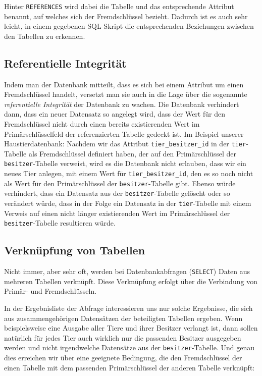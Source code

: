 Hinter \lstinline|REFERENCES| wird dabei die Tabelle und das entsprechende
Attribut benannt, auf welches sich der Fremdschlüssel bezieht. Dadurch ist es
auch sehr leicht, in einem gegebenen SQL-Skript die entsprechenden Beziehungen
zwischen den Tabellen zu erkennen.


\subsection{Referentielle Integrität}

Indem man der Datenbank mitteilt, dass es sich bei einem Attribut um einen
Fremdschlüssel handelt, versetzt man sie auch in die Lage über die sogenannte
\emph{referentielle Integrität} der Datenbank zu wachen. Die Datenbank
verhindert dann, dass ein neuer Datensatz so angelegt wird, dass der Wert für
den Fremdschlüssel nicht durch einen bereits existierenden Wert im
Primärschlüsselfeld der referenzierten Tabelle gedeckt ist. Im Beispiel unserer
Haustierdatenbank: Nachdem wir das Attribut \lstinline|tier_besitzer_id| in der
\lstinline|tier|-Tabelle als Fremdschlüssel definiert haben, der auf den
Primärschlüssel der \lstinline|besitzer|-Tabelle verweist, wird es die Datenbank
nicht erlauben, dass wir ein neues Tier anlegen, mit einem Wert für
\lstinline|tier_besitzer_id|, den es so noch nicht als Wert für den
Primärschlüssel der \lstinline|besitzer|-Tabelle gibt. Ebenso würde verhindert,
dass ein Datensatz aus der \lstinline|besitzer|-Tabelle gelöscht oder so
verändert würde, dass in der Folge ein Datensatz in der \lstinline|tier|-Tabelle
mit einem Verweis auf einen nicht länger existierenden Wert im Primärschlüssel
der \lstinline|besitzer|-Tabelle resultieren würde.



\subsection{Verknüpfung von Tabellen}

Nicht immer, aber sehr oft, werden bei Datenbankabfragen (\lstinline|SELECT|)
Daten aus mehreren Tabellen verknüpft. Diese Verknüpfung erfolgt über die
Verbindung von Primär- und Fremdschlüsseln.

In der Ergebnisliste der Abfrage interessieren uns nur solche Ergebnisse, die
sich aus zusammengehörigen Datensätzen der beteiligten Tabellen ergeben. Wenn
beispielsweise eine Ausgabe aller Tiere und ihrer Besitzer verlangt ist, dann
sollen natürlich für jedes Tier auch wirklich nur die passenden Besitzer
ausgegeben werden und nicht irgendwelche Datensätze aus der
\lstinline|besitzer|-Tabelle. Und genau dies erreichen wir über eine geeignete
Bedingung, die den Fremdschlüssel der einen Tabelle mit dem passenden
Primärschlüssel der anderen Tabelle verknüpft:


